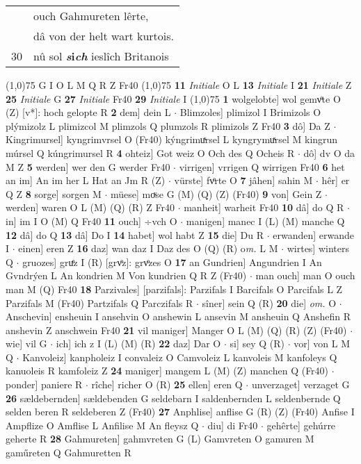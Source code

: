 \documentclass[8pt,a4paper,notitlepage]{article}
\begin{document}
\begin{table}[ht]
\begin{minipage}[t]{0.5\linewidth}
\begin{tabular}{rl}
 & ouch Gahmureten lêrte,\\ 
 & dâ von der helt wart kurtois.\\ 
30 & nû sol \textbf{\textit{s}i\textit{ch}} ieslîch Britanois\\ 
\end{tabular}
\scriptsize
\line(1,0){75} \newline
G I O L M Q R Z Fr40 \newline
\line(1,0){75} \newline
\textbf{11} \textit{Initiale} O L  \textbf{13} \textit{Initiale} I  \textbf{21} \textit{Initiale} Z  \textbf{25} \textit{Initiale} G  \textbf{27} \textit{Initiale} Fr40  \textbf{29} \textit{Initiale} I  \newline
\line(1,0){75} \newline
\textbf{1} wolgelobte] wol gemvͦte O (Z) [v*]: hoch gelopte R \textbf{2} dem] dein L  $\cdot$ Blimzoles] plimizol I Brimizols O plýmizolz L plimizcol M plimzols Q plumzols R plimizols Z Fr40 \textbf{3} dô] Da Z  $\cdot$ Kingrimursel] kyngrimvrsel O (Fr40) kýngrimuͯrsel L kyngrymuͯrsel M kingrun múrsel Q kúngrimursel R \textbf{4} ohteiz] Got weiz O Och des Q Ocheis R  $\cdot$ dô] dv O da M Z \textbf{5} werden] wer den G werder Fr40  $\cdot$ virrigen] vrrigen Q wirrigen Fr40 \textbf{6} het an im] An im her L Hat an Jm R (Z)  $\cdot$ vürste] fvͦrte O \textbf{7} jâhen] sahin M  $\cdot$ hêr] er Q Z \textbf{8} sorge] sorgen M  $\cdot$ müese] moͮse G (M) (Q) (Z) (Fr40) \textbf{9} von] Gein Z  $\cdot$ werden] waren O L (M) (Q) (R) Z Fr40  $\cdot$ manheit] warheit Fr40 \textbf{10} dâ] do Q R  $\cdot$ in] im I O (M) Q Fr40 \textbf{11} ouch] ÷vch O  $\cdot$ manigen] manec I (L) (M) manche Q \textbf{12} dâ] do Q \textbf{13} dâ] Do I \textbf{14} habet] wol habt Z \textbf{15} die] Du R  $\cdot$ erwanden] erwande I  $\cdot$ einen] eren Z \textbf{16} daz] wan daz I Daz des O (Q) (R) o\textit{m. } L M  $\cdot$ wirtes] winters Q  $\cdot$ gruozes] gruͤz I (R) [grvͦz]: grvͦzes  O \textbf{17} an Gundrien] Angundrien I An Gvndrýen L An kondrien M Von kundrien Q R Z (Fr40)  $\cdot$ man ouch] man O ouch man M (Q) Fr40 \textbf{18} Parzivales] [parzifals]: Parzifals I Barcifals O Parcifals L Z Parzifals M (Fr40) Partzifals Q Parczifals R  $\cdot$ sîner] sein Q (R) \textbf{20} die] \textit{om.} O  $\cdot$ Anschevin] ensheuin I ansehvin O anshewin L ansevin M ansheuin Q Anshefin R anshevin Z anschwein Fr40 \textbf{21} vil maniger] Manger O L (M) (Q) (R) (Z) (Fr40)  $\cdot$ wie] vil G  $\cdot$ ich] ich z I (L) (M) (R) \textbf{22} daz] Dar O  $\cdot$ si] sey Q (R)  $\cdot$ vor] von L M Q  $\cdot$ Kanvoleiz] kanpholeiz I convaleiz O Camvoleiz L kanvoleis M kanfoleys Q kanuoleis R kamfoleiz Z \textbf{24} maniger] mangem L (M) (Z) manchen Q (Fr40)  $\cdot$ ponder] paniere R  $\cdot$ rîche] richer O (R) \textbf{25} ellen] eren Q  $\cdot$ unverzaget] verzaget G \textbf{26} sældebernden] sældebenden G seldebarn I saldenbernden L seldenbernde Q selden beren R seldeberen Z (Fr40) \textbf{27} Anphlise] anflise G (R) (Z) (Fr40) Anfise I Ampflize O Amflise L Anfilise M An fleysz Q  $\cdot$ diu] di Fr40  $\cdot$ gehêrte] gehúrre geherte R \textbf{28} Gahmureten] gahmvreten G (L) Gamvreten O gamuren M gaműreten Q Gahmuretten R 
\end{minipage}
\end{table}
\end{document}
